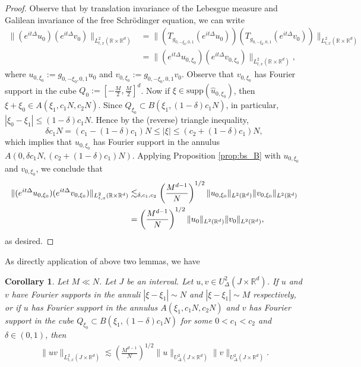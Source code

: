 \documentclass[reqno,11pt]{amsart}
\theoremstyle{plain}
\newtheorem{corollary}[theorem]{Corollary}
\theoremstyle{definition}
\numberwithin{equation}{section}
\numberwithin{theorem}{section}
\def\leq{\leqslant}
\def\R{\mathbb{R}}
\begin{document}
\begin{proof}
 Observe that by translation invariance of the Lebesgue measure and Galilean invariance of the free Schr\"{o}dinger equation, we can write
\begin{align}
\|(e^{it\Delta}u_{0})(e^{it\Delta}v_{0})\|_{L_{t,x}^{2}(\R\times\R^{d})} &= \|\left({T_{g_{0,-\xi_{0},0,1}}(e^{it\Delta}u_{0})}\right)\left({T_{g_{0,-\xi_{0},0,1}}(e^{it\Delta}v_{0})}\right)\|_{L_{t,x}^{2}(\R\times\R^{d})} \nonumber\\
&= \|(e^{it\Delta}u_{0,\xi_{0}})(e^{it\Delta}v_{0,\xi_{0}})\|_{L_{t,x}^{2}(\R\times\R^{d})},
\end{align}
where $u_{0,\xi_{0}} := g_{0,-\xi_{0},0,1}u_{0}$ and $v_{0,\xi_{0}} := g_{0,-\xi_{0},0,1}v_{0}$. Observe that $v_{0,\xi_{0}}$ has Fourier support in the cube $Q_{0} := [-\frac{M}{2},\frac{M}{2}]^{d}$. Now if $\xi\in \text{supp}(\hat{u}_{0,\xi_{0}})$, then $\xi+\xi_{0}\in A(\xi_1,c_{1}N,c_{2}N)$. Since $Q_{\xi_{0}} \subset B(\xi_1,(1-\delta)c_{1}N)$, in particular, $|\xi_{0}-\xi_1| \leq (1-\delta)c_{1}N$. Hence by the (reverse) triangle inequality,
\begin{equation}
\delta c_{1}N = \left({c_{1}-(1-\delta)c_{1}}\right)N \leq |\xi| \leq \left({c_{2}+(1-\delta)c_{1}}\right)N,
\end{equation}
which implies that $u_{0,\xi_{0}}$ has Fourier support in the annulus $A(0,\delta c_{1}N, (c_{2}+(1-\delta)c_{1})N)$. Applying Proposition \ref{prop:bs_B} with $u_{0,\xi_{0}}$ and $v_{0,\xi_{0}}$, we conclude that
\begin{align*}
\|(e^{it\Delta}u_{0,\xi_{0}})(e^{it\Delta}v_{0,\xi_{0}})\|_{L_{t,x}^{2}(\R\times\R^{d})} &\lesssim_{\delta,c_{1},c_{2}} \left({\frac{M^{d-1}}{N}}\right)^{1/2} \|u_{0,\xi_{0}}\|_{L^{2}(\R^{d})} \|v_{0,\xi_{0}}\|_{L^{2}(\R^{d})}\notag\\
&= \left({\frac{M^{d-1}}{N}}\right)^{1/2} \|u_{0}\|_{L^{2}(\R^{d})} \|v_{0}\|_{L^{2}(\R^{d})},
\end{align*}
as desired.
\end{proof}
As directly application of above two lemmas, we have
\begin{corollary}\label{bilinear}
Let $M\ll N$. Let $J$ be an interval. Let $u,v\in U_{\Delta}^2(J\times\R^d)$. If $u$ and $v$ have Fourier supports in the annuli $|\xi-\xi_1|\sim N$ and $|\xi-\xi_1|\sim M$ respectively, or if $u$ has Fourier support in the annulus $A(\xi_1,c_{1}N,c_{2}N)$ and $v$ has Fourier support in the cube $Q_{\xi_{0}} \subset B(\xi_1,(1-\delta)c_{1}N)$ for some $0<c_{1}<c_{2}$ and  $\delta \in (0,1)$, then
\begin{align}
\|uv\|_{L_{t,x}^2(J\times\R^d)}\lesssim \left({\frac{M^{d-1}}{N}}\right)^{1/2}  \|u\|_{U_{\Delta}^2(J\times\R^d)}\|v\|_{U_{\Delta}^2(J\times\R^d)}.
\end{align}
\end{corollary}
    
\end{document}
